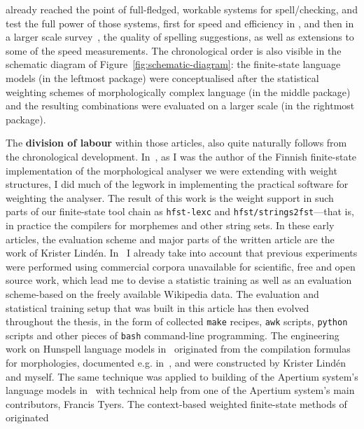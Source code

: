 \documentclass[officiallayout]{unihelcompling}
\begin{document}
already reached the point of full-fledged, workable systems for
spell\-/checking, and test the full power of those systems, first for speed and
efficiency in , and then in a larger scale
survey~, the quality of spelling suggestions, as
well as extensions to some of the speed measurements.  The chronological order
is also visible in the schematic diagram of Figure~\ref{fig:schematic-diagram}:
the finite-state language models (in the leftmost package) were conceptualised
after the statistical weighting schemes of morphologically complex language (in
the middle package) and the resulting combinations were evaluated on a larger
scale (in the rightmost package).

The \textbf{division of labour} within those articles, also quite naturally
follows from the chronological development.
In~, as I was the author
of the Finnish finite-state implementation of the morphological analyser we
were extending with weight structures, I did much of the legwork in
implementing the practical software for weighting the analyser. The result of
this work is the weight support in such parts of our finite-state tool chain as
\texttt{hfst-lexc} and \texttt{hfst\-/strings2fst}---that is, in practice the
compilers for morphemes and other string sets. In these early articles, the
evaluation scheme and major parts of the written article are the work of
Krister Lindén.  In~ I already take into
account that previous experiments were performed using commercial corpora
unavailable for scientific, free and open source work, which lead me to devise
a statistic training as well as an evaluation scheme-based on the freely
available Wikipedia data. The evaluation and statistical training setup that
was built in this article has then evolved throughout the thesis, in the form
of collected \texttt{make} recipes, \texttt{awk} scripts, \texttt{python}
scripts and other pieces of \texttt{bash} command-line programming. The
engineering work on Hunspell language models
in~ originated from the
compilation formulas for morphologies, documented e.g.\/
in~\cite{linden2009hfst}, and were constructed by Krister Lindén and myself.
The same technique was applied to building of the Apertium system's language
models in~ with technical help from one of the
Apertium system's main contributors, Francis Tyers.  The context-based weighted
finite-state methods of  originated
\end{document}
